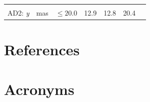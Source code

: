\documentclass[DM,toc,lsstdraft]{lsstdoc}
\begin{document}
\begin{longtable}[]{@{}lllllll@{}}
\begin{minipage}[t]{0.17\columnwidth}
  \end{minipage}\tabularnewline
  \begin{minipage}[t]{0.12\columnwidth}\raggedright\strut
  AD2: \emph{y}\strut
  \end{minipage} & \begin{minipage}[t]{0.06\columnwidth}\raggedright\strut
  mas\strut
  \end{minipage} & \begin{minipage}[t]{0.14\columnwidth}\raggedright\strut
  \(\leq 20.0\)\strut
  \end{minipage} & \begin{minipage}[t]{0.12\columnwidth}\raggedright\strut
  12.9 \strut
  \end{minipage} & \begin{minipage}[t]{0.12\columnwidth}\raggedright\strut
  12.8 \strut
  \end{minipage} & \begin{minipage}[t]{0.12\columnwidth}\raggedright\strut
  20.4 \strut
  \end{minipage} & \begin{minipage}[t]{0.17\columnwidth}\raggedright\strut

  \end{minipage}\tabularnewline
  \bottomrule
  \end{longtable}


\appendix

\section{References} \label{sec:bib}
\renewcommand{\refname}{} %


\section{Acronyms} \label{sec:acronyms}

\end{document}
